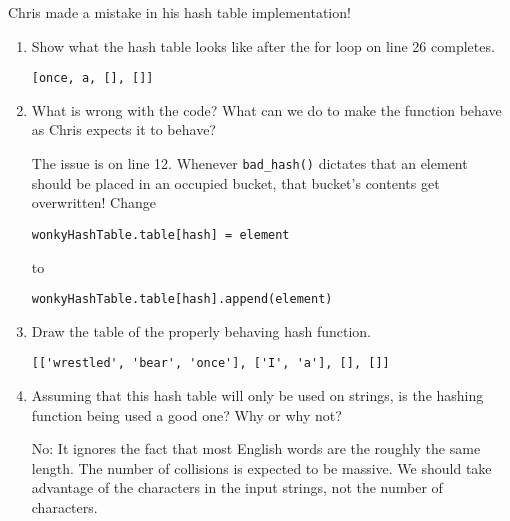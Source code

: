 %
%


Chris made a mistake in his hash table implementation!

    

    \begin{enumerate}
    \item Show what the hash table looks like after the for loop on line 26
          completes. 

        \begin{answer}
		\begin{lstlisting}[numbers=none]
[once, a, [], []]
		\end{lstlisting}
        \end{answer}

    \item What is wrong with the code? What can we do to make the function behave as Chris expects it to behave?

        \begin{answer}
        The issue is on line 12. Whenever \texttt{bad\_hash()} dictates that an element should be placed in an occupied bucket, that bucket's contents get overwritten! Change 
\begin{lstlisting}[numbers=none]
wonkyHashTable.table[hash] = element
\end{lstlisting} to 
\begin{lstlisting}[numbers=none]
wonkyHashTable.table[hash].append(element)
\end{lstlisting}
        \end{answer}

    \item Draw the table of the properly behaving hash function.
        
        \begin{answer}
		\begin{lstlisting}[numbers=none]
[['wrestled', 'bear', 'once'], ['I', 'a'], [], []]
		\end{lstlisting}
    \end{answer}
\item Assuming that this hash table will only be used on strings, is the hashing function being used a good one? Why or why not?

    \begin{answer}
        No: It ignores the fact that most English words are the roughly the same length. The number of collisions is expected to be massive. We should take advantage of the characters in the input strings, not the number of characters.
    \end{answer}
    \end{enumerate}